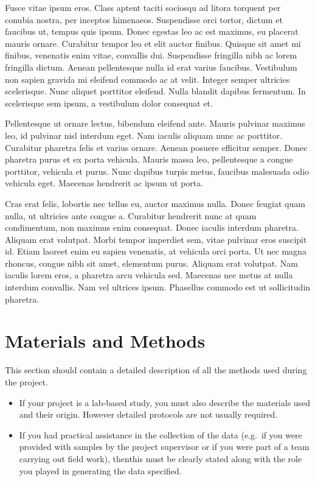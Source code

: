 \documentclass[
  11pt,
  a4paper,
]{scrreprt}
\providecommand{\tightlist}{%
  \setlength{\itemsep}{0pt}\setlength{\parskip}{0pt}}\usepackage{longtable,booktabs,array}
\begin{document}
Fusce vitae ipsum eros. Class aptent taciti sociosqu ad litora torquent
per conubia nostra, per inceptos himenaeos. Suspendisse orci tortor,
dictum et faucibus ut, tempus quis ipsum. Donec egestas leo ac est
maximus, eu placerat mauris ornare. Curabitur tempor leo et elit auctor
finibus. Quisque sit amet mi finibus, venenatis enim vitae, convallis
dui. Suspendisse fringilla nibh ac lorem fringilla dictum. Aenean
pellentesque nulla id erat varius faucibus. Vestibulum non sapien
gravida mi eleifend commodo ac at velit. Integer semper ultricies
scelerisque. Nunc aliquet porttitor eleifend. Nulla blandit dapibus
fermentum. In scelerisque sem ipsum, a vestibulum dolor consequat et.

Pellentesque ut ornare lectus, bibendum eleifend ante. Mauris pulvinar
maximus leo, id pulvinar nisl interdum eget. Nam iaculis aliquam nunc ac
porttitor. Curabitur pharetra felis et varius ornare. Aenean posuere
efficitur semper. Donec pharetra purus et ex porta vehicula. Mauris
massa leo, pellentesque a congue porttitor, vehicula et purus. Nunc
dapibus turpis metus, faucibus malesuada odio vehicula eget. Maecenas
hendrerit ac ipsum ut porta.

Cras erat felis, lobortis nec tellus eu, auctor maximus nulla. Donec
feugiat quam nulla, ut ultricies ante congue a. Curabitur hendrerit nunc
at quam condimentum, non maximus enim consequat. Donec iaculis interdum
pharetra. Aliquam erat volutpat. Morbi tempor imperdiet sem, vitae
pulvinar eros suscipit id. Etiam laoreet enim eu sapien venenatis, at
vehicula orci porta. Ut nec magna rhoncus, congue nibh sit amet,
elementum purus. Aliquam erat volutpat. Nam iaculis lorem eros, a
pharetra arcu vehicula sed. Maecenas nec metus at nulla interdum
convallis. Nam vel ultrices ipsum. Phasellus commodo est ut sollicitudin
pharetra.


\chapter{Materials and Methods}\label{materials-and-methods}

This section should contain a detailed description of all the methods
used during the project.

\begin{itemize}
\tightlist
\item
  If your project is a lab-based study, you must also describe the
  materials used and their origin. However detailed protocols are not
  usually required.
\item
  If you had practical assistance in the collection of the data (e.g.~if
  you were provided with samples by the project supervisor or if you
  were part of a team carrying out field work), thenthis must be clearly
  stated along with the role you played in generating the data
  specified.
\end{itemize}
\end{document}
